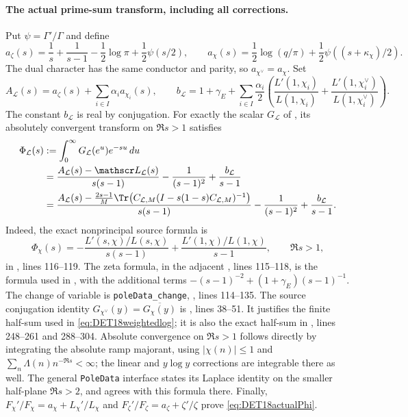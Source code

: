 \paragraph{The actual prime-sum transform, including all corrections.}
Put $\psi=\Gamma'/\Gamma$ and define
\[
 a_\zeta(s)=\frac1s+\frac1{s-1}
 -\frac12\log\pi+\frac12\psi(s/2),\qquad
 a_\chi(s)=\frac12\log(q/\pi)
 +\frac12\psi((s+\kappa_\chi)/2).
\]
The dual character has the same conductor and parity, so
$a_{\chi^\vee}=a_\chi$. Set
\[
 A_{\mathcal L}(s)=a_\zeta(s)+\sum_{i\in I}\alpha_i a_{\chi_i}(s),
 \qquad
 b_{\mathcal L}=1+\gamma_E+
 \sum_{i\in I}\frac{\alpha_i}{2}
 \left(\frac{L'(1,\chi_i)}{L(1,\chi_i)}
 +\frac{L'(1,\chi_i^\vee)}{L(1,\chi_i^\vee)}\right).
\]
The constant $b_{\mathcal L}$ is real by conjugation.
For exactly the scalar $G_{\mathcal L}$ of , its
absolutely convergent transform on $\Re s>1$ satisfies
\begin{align}\label{eq:DET18actualPhi}
 \Phi_{\mathcal L}(s)
 &:=\int_0^\infty G_{\mathcal L}(e^u)e^{-su}\,du \notag\\
 &=\frac{A_{\mathcal L}(s)-\mathscr L_{\mathcal L}(s)}
 {s(s-1)}
 -\frac1{(s-1)^2}+\frac{b_{\mathcal L}}{s-1}\notag\\
 &=\frac{A_{\mathcal L}(s)-
 \frac{2s-1}{M}\Tr\!\left(C_{\mathcal L,M}
 (I-s(1-s)C_{\mathcal L,M})^{-1}\right)}
 {s(s-1)}
 -\frac1{(s-1)^2}+\frac{b_{\mathcal L}}{s-1}.
\end{align}
Indeed, the exact nonprincipal source formula is
\[
 \Phi_\chi(s)=
 -\frac{L'(s,\chi)/L(s,\chi)}{s(s-1)}
 +\frac{L'(1,\chi)/L(1,\chi)}{s-1},
 \qquad \Re s>1,
\]
in
,
lines 116--119. The zeta formula, in the adjacent
, lines 115--118, is the formula used in
, with the additional terms
$-(s-1)^{-2}+(1+\gamma_E)(s-1)^{-1}$.
The change of variable is \texttt{poleData\_change},
, lines 114--135.
The source conjugation identity
$G_{\chi^\vee}(y)=\overline{G_\chi(y)}$ is
, lines 38--51. It justifies the finite
half-sum used in \eqref{eq:DET18weightedlog}; it is also the exact
half-sum in , lines 248--261 and 288--304.
Absolute convergence on $\Re s>1$ follows directly by integrating
the absolute ramp majorant, using $|\chi(n)|\le1$ and
$\sum_n\Lambda(n)n^{-\Re s}<\infty$; the linear and $y\log y$
corrections are integrable there as well. The general
\texttt{PoleData} interface states its Laplace identity on the
smaller half-plane $\Re s>2$, and agrees with this formula there.
Finally,
$F_\chi'/F_\chi=a_\chi+L_\chi'/L_\chi$ and
$F_\zeta'/F_\zeta=a_\zeta+\zeta'/\zeta$ prove
\eqref{eq:DET18actualPhi}.

